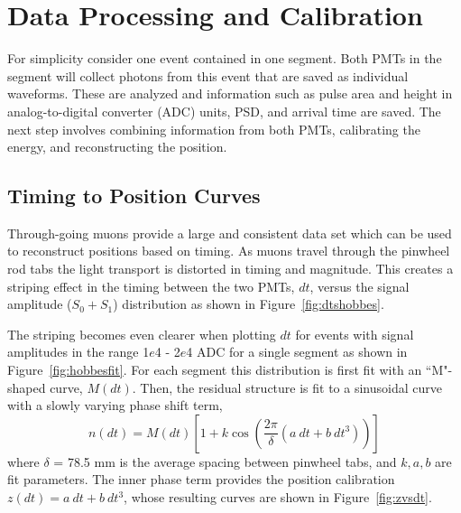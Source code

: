 \section{Data Processing and Calibration}

For simplicity consider one event contained in one segment. 
Both PMTs in the segment will collect photons from this event that are saved as individual waveforms. 
These are analyzed and information such as pulse area and height in analog-to-digital converter (ADC) units, PSD, and arrival time are saved. 
The next step involves combining information from both PMTs, calibrating the energy, and reconstructing the position. 


\subsection{Timing to Position Curves}

Through-going muons provide a large and consistent data set which can be used to reconstruct positions based on timing.
As muons travel through the pinwheel rod tabs the light transport is distorted in timing and magnitude. 
This creates a striping effect in the timing between the two PMTs, $dt$, versus the signal amplitude ($S_0 + S_1$) distribution as shown in Figure~\ref{fig:dtshobbes}.

The striping becomes even clearer when plotting $dt$ for events with signal amplitudes in the range  1$e$4 -  2$e$4 ADC for a single segment as shown in Figure~\ref{fig:hobbesfit}.
For each segment this distribution is first fit with an ``M"-shaped curve, $M(dt)$. 
Then, the residual structure is fit to a sinusoidal curve with a slowly varying phase shift term,
\begin{equation}
	n(dt) = M(dt)\left[1 + k\cos\left(\frac{2\pi}{\delta}\left(a~dt + b~dt^3\right)\right)\right]
\end{equation}
where $\delta$ = 78.5 mm is the average spacing between pinwheel tabs, and $k, a, b$ are fit parameters.
The inner phase term provides the position calibration $z(dt) = a~dt + b~dt^3$, whose resulting curves are shown in Figure~\ref{fig:zvsdt}.

\newpage

